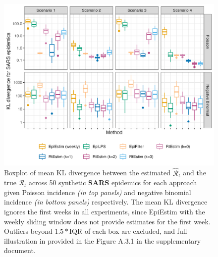 \documentclass[10pt,letterpaper]{article}
\def\calR{\mathcal{R}}
\begin{document}
\begin{figure}[!ht]
  \centering
  \includegraphics[width=.99\textwidth]{fig/fig_kl_week_sars.png}
  \caption{Boxplot of mean KL divergence between the estimated 
  $\hat{\calR}_t$ and the true $\calR_t$ across 50 synthetic \textbf{SARS} epidemics for 
  each approach given Poisson incidence \textit{(in top panels)} and negative 
  binomial incidence \textit{(in bottom panels)} respectively. 
  The mean KL divergence ignores the first weeks in all experiments, 
  since EpiEstim with the weekly sliding window does not provide estimates 
  for the first week. Outliers beyond $1.5*$IQR of each box are excluded, 
  and full illustration in provided in the Figure A.3.1 in the supplementary document.} 
  \label{fig:kl-res-sars}
\end{figure}
\end{document}
